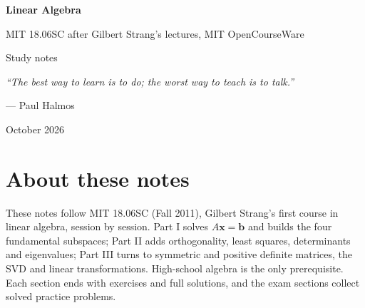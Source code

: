 \documentclass[11pt]{article}
\theoremstyle{definition}
\theoremstyle{plain}
\theoremstyle{remark}
\newcommand{\vb}[1]{\boldsymbol{#1}}          %
\begin{document}
\begin{titlepage}
  \raggedright
  \vspace*{2.2cm}
  {\Huge\bfseries Linear Algebra\par}
  \vspace{0.8em}
  {\Large MIT 18.06SC \textperiodcentered{} after Gilbert Strang's lectures, MIT OpenCourseWare\par}
  \vspace{0.4em}
  {\large Study notes\par}
  \vfill
  \begin{flushright}
    \begin{minipage}{0.46\textwidth}
      \raggedleft{}
      {\itshape ``The best way to learn is to do; the worst way to teach is to talk.''\par}
      \vspace{0.5em}
      --- Paul Halmos\par
    \end{minipage}
  \end{flushright}
  \vfill
  {\small October 2026\par}
\end{titlepage}

\setcounter{tocdepth}{1}%
\tableofcontents
\clearpage

\section*{About these notes}
These notes follow MIT 18.06SC (Fall 2011), Gilbert Strang's first course in linear algebra, session by session. Part I solves $A\vb{x}=\vb{b}$ and builds the four fundamental subspaces; Part II adds orthogonality, least squares, determinants and eigenvalues; Part III turns to symmetric and positive definite matrices, the SVD and linear transformations. High-school algebra is the only prerequisite. Each section ends with exercises and full solutions, and the exam sections collect solved practice problems.
\end{document}
